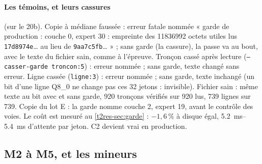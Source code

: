 \paragraph{Les témoins, et leurs cassures} (sur le 20b). Copie à médiane faussée : erreur fatale nommée « garde de production : couche 0, expert 30 : empreinte des \num{11836992} octets utiles lus \texttt{17d8974e}… au lieu de \texttt{9aa7c5fb}… » ; sans garde (la cassure), la passe va au bout, avec le texte du fichier sain, comme à l'épreuve. Tronçon cassé après lecture (\texttt{--casser-garde troncon:5}) : erreur nommée ; sans garde, texte changé sans erreur. Ligne cassée (\texttt{ligne:3}) : erreur nommée ; sans garde, texte inchangé (un bit d'une ligne Q8\_0 ne change pas ces 32 jetons : invisible). Fichier sain : même texte au bit avec et sans garde, 920 tronçons vérifiés sur 920 lus, 739 lignes sur 739. Copie du lot E : la garde nomme couche 2, expert 19, avant le contrôle des voies. Le coût est mesuré au \cref{t2res-sec:garde} : $-1{,}6\,\%$ à disque égal, \SIrange{5.2}{5.4}{\milli\second} d'attente par jeton. C2 devient vrai en production.

\subsection{M2 à M5, et les mineurs}\label{t2e-sec:m2-m5}

